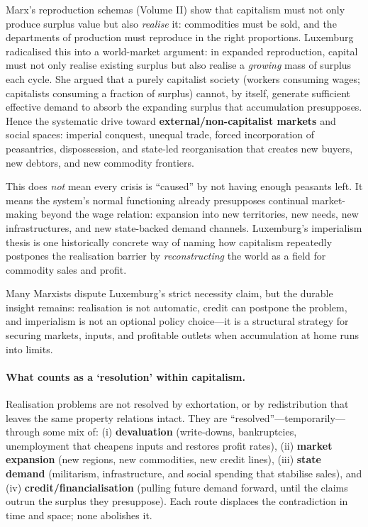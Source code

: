 Marx’s reproduction schemas (Volume II) show that capitalism must not only produce surplus value
but also \emph{realise} it: commodities must be sold, and the departments of production must
reproduce in the right proportions.
Luxemburg radicalised this into a world-market argument: in expanded reproduction, capital must
not only realise existing surplus but also realise a \emph{growing} mass of surplus each cycle.
She argued that a purely capitalist society (workers consuming wages; capitalists consuming a fraction
of surplus) cannot, by itself, generate sufficient effective demand to absorb the expanding surplus that
accumulation presupposes.
Hence the systematic drive toward \textbf{external/non-capitalist markets} and social spaces:
imperial conquest, unequal trade, forced incorporation of peasantries, dispossession, and
state-led reorganisation that creates new buyers, new debtors, and new commodity frontiers.\cite{Luxemburg1913}

This does \emph{not} mean every crisis is “caused” by not having enough peasants left.
It means the system’s normal functioning already presupposes continual market-making beyond the wage
relation: expansion into new territories, new needs, new infrastructures, and new state-backed demand
channels.
Luxemburg’s imperialism thesis is one historically concrete way of naming how capitalism repeatedly
postpones the realisation barrier by \emph{reconstructing} the world as a field for commodity sales and profit.

Many Marxists dispute Luxemburg’s strict necessity claim, but the durable insight remains:
realisation is not automatic, credit can postpone the problem, and imperialism is not an optional
policy choice---it is a structural strategy for securing markets, inputs, and profitable outlets
when accumulation at home runs into limits.

\paragraph{What counts as a `resolution' within capitalism.}
Realisation problems are not resolved by exhortation, or by redistribution that leaves the same property
relations intact.
They are “resolved”---temporarily---through some mix of:
(i) \textbf{devaluation} (write-downs, bankruptcies, unemployment that cheapens inputs and restores profit rates),
(ii) \textbf{market expansion} (new regions, new commodities, new credit lines),
(iii) \textbf{state demand} (militarism, infrastructure, and social spending that stabilise sales), and
(iv) \textbf{credit/financialisation} (pulling future demand forward, until the claims outrun the surplus they presuppose).
Each route displaces the contradiction in time and space; none abolishes it.


